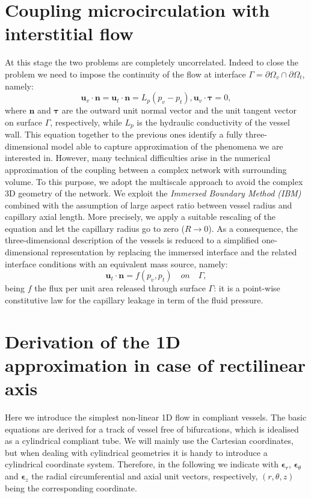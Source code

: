 \documentclass[a4paper]{report}
\begin{document}
\section{Coupling microcirculation with interstitial flow}
	At this stage the two problems are completely uncorrelated. Indeed to close the problem we need to impose the continuity of the flow at interface $\Gamma=\partial \Omega_v \cap \partial \Omega_t$, namely:
\begin{equation}
\mathbf{u}_{v} \cdot \mathbf{n} = \mathbf{u}_{t} \cdot \mathbf{n} = L_{p} ( p_{v} - p_{t} ) ,   \mathbf{u}_{v} \cdot \boldsymbol{\tau} = 0 ,
\end{equation}
where $\mathbf{n}$ and $\boldsymbol{\tau}$ are the outward unit normal vector and the unit tangent vector on surface $\Gamma$, respectively, while $L_{p}$ is the hydraulic conductivity of the vessel wall.
This equation together to the previous ones identify a fully three-dimensional model able to capture approximation of the phenomena we are interested in. However, many technical difficulties arise in the numerical approximation of the coupling between a complex network with surrounding volume. To this purpose, we adopt the multiscale approach to avoid the complex 3D geometry of the network. We exploit the {\it Immersed Boundary Method (IBM)} combined with the assumption of large aspect ratio between vessel radius and capillary axial length. More precisely, we apply a suitable rescaling of the equation and let the capillary radius go to zero ($ R \rightarrow 0$).\newline
As a consequence, the three-dimensional description of the vessels is reduced to a simplified one-dimensional representation by replacing the immersed interface and the related interface conditions with an equivalent mass source, namely:
\begin{equation}
 \mathbf{u}_{t} \cdot \mathbf{n} =f ( p_{v} , p_{t} )\quad on \quad \Gamma ,
\end{equation}
being $f$ the flux per unit area released through surface $\Gamma$: it is a point-wise constitutive law for the capillary leakage in term of the fluid pressure.



	\section{Derivation of the 1D approximation in case of rectilinear axis}
Here we introduce the simplest non-linear 1D flow in compliant vessels.\newline
The basic equations are derived for a track of vessel free of bifurcations, which is idealised as a cylindrical compliant tube.\newline
We will mainly use the Cartesian coordinates, but when dealing with cylindrical geometries it is handy to introduce a cylindrical coordinate system. Therefore, in the following we indicate with $\boldsymbol{\epsilon}_{r}$, $\boldsymbol{\epsilon}_{\theta}$ and $\boldsymbol{\epsilon}_{z}$ the radial circumferential and axial unit vectors, respectively, $(r,\theta,z)$ being the corresponding coordinate.
\end{document}
